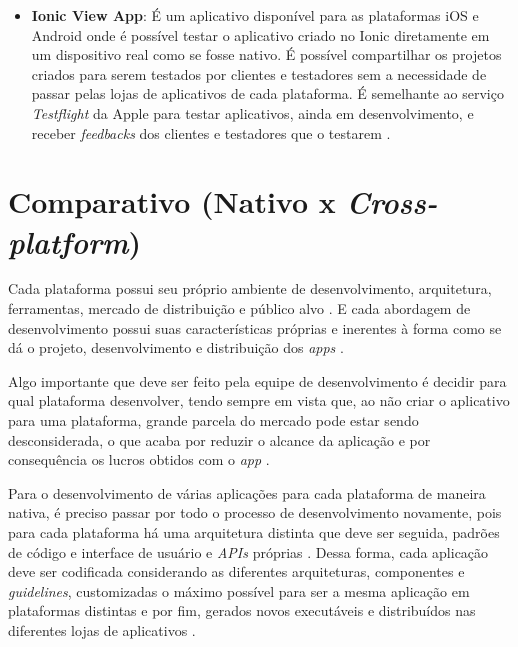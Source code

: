 \begin{itemize}
    \item \textbf{Ionic View App}: É um aplicativo disponível para as plataformas iOS e Android onde é possível testar o 
    aplicativo criado no Ionic diretamente em um dispositivo real como se fosse nativo. É possível compartilhar os projetos criados para serem
    testados por clientes e testadores sem a necessidade de passar pelas lojas de aplicativos de cada plataforma. É semelhante ao serviço 
    \textit{Testflight} da Apple para testar aplicativos, ainda em desenvolvimento, e receber \textit{feedbacks} dos clientes e testadores que o testarem \cite{drifty_ionic_2016-5}. 
     
\end{itemize}

\section{Comparativo (Nativo x \textit{Cross-platform})} \label{section:comparativo}



Cada plataforma possui seu próprio ambiente de desenvolvimento, arquitetura, ferramentas, mercado de distribuição e público alvo \cite{shakshuki_4th_2013}.
E cada abordagem de desenvolvimento possui suas características próprias e inerentes à forma como se dá o projeto, desenvolvimento e distribuição dos \textit{apps} \cite{corral_ant_2012}.

Algo importante que deve ser feito pela equipe de desenvolvimento é decidir para qual plataforma desenvolver, tendo sempre em vista que, ao não criar o aplicativo para uma plataforma, grande parcela do mercado pode estar sendo desconsiderada, o que acaba por reduzir o alcance
da aplicação e por consequência os lucros obtidos com o \textit{app} \cite{corral_ant_2012}. 

Para o desenvolvimento de várias aplicações para cada plataforma de maneira nativa, é preciso passar por todo o processo de desenvolvimento novamente, 
pois para cada plataforma há uma arquitetura distinta que deve ser seguida, padrões de código e interface de usuário e \textit{APIs} próprias \cite{holzinger_making_2012}.
Dessa forma, cada aplicação deve ser codificada considerando as diferentes arquiteturas, componentes e \textit{guidelines}, customizadas o máximo possível 
para ser a mesma aplicação em plataformas distintas e por fim, gerados novos executáveis e distribuídos nas diferentes lojas de aplicativos \cite{corral_ant_2012}.

